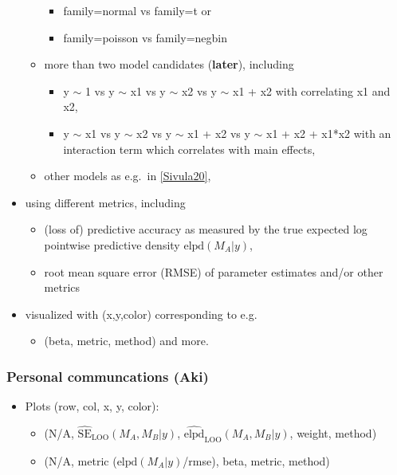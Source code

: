 \begin{itemize}
\begin{itemize}
    \begin{itemize}
    \tightlist
    \item
      family=normal vs family=t or
    \item
      family=poisson vs family=negbin
    \end{itemize}
  \item
    more than two model candidates (\textbf{later}), including

    \begin{itemize}
    \tightlist
    \item
      y \(\sim\) 1 vs y \(\sim\) x1 vs y \(\sim\) x2 vs y \(\sim\) x1 +
      x2 with correlating x1 and x2,
    \item
      y \(\sim\) x1 vs y \(\sim\) x2 vs y \(\sim\) x1 + x2 vs y \(\sim\)
      x1 + x2 + x1*x2 with an interaction term which correlates with
      main effects,
    \end{itemize}
  \item
    other models as e.g.~in
    \href{http://dx.doi.org/10.48550/arXiv.2008.10296}{{[}Sivula20{]}},
  \end{itemize}
\item
  using different metrics, including

  \begin{itemize}
  \tightlist
  \item
    (loss of) predictive accuracy as measured by the true expected log
    pointwise predictive density \(\mathrm{elpd}(M_A | y)\),
  \item
    root mean square error (RMSE) of parameter estimates and/or other
    metrics
  \end{itemize}
\item
  visualized with (x,y,color) corresponding to e.g.

  \begin{itemize}
  \tightlist
  \item
    (beta, metric, method) and more.
  \end{itemize}
\end{itemize}

\hypertarget{personal-communcations-aki}{%
\subsubsection{Personal communcations
(Aki)}\label{personal-communcations-aki}}

\begin{itemize}
\tightlist
\item
  Plots (row, col, x, y, color):

  \begin{itemize}
  \tightlist
  \item
    (N/A, \(\widehat{\mathrm{SE}}_\mathrm{LOO}(M_A, M_B | y)\),
    \(\widehat{\mathrm{elpd}}_\mathrm{LOO}(M_A, M_B | y)\), weight,
    method)
  \item
    (N/A, metric (\(\mathrm{elpd}(M_A | y)\)/rmse), beta, metric,
    method)
  \end{itemize}
\end{itemize}

